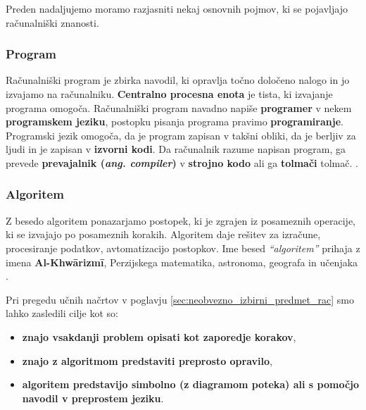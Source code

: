 
Preden nadaljujemo moramo razjasniti nekaj osnovnih pojmov, ki se
pojavljajo računalniški znanosti.

\subsubsection{Program}
\label{sec:program}

Računalniški program je zbirka navodil, ki opravlja točno določeno
nalogo in jo izvajamo na računalniku. \textbf{Centralno procesna
  enota} je tista, ki izvajanje programa omogoča. Računalniški program
navadno napiše \textbf{programer} v nekem \textbf{programskem jeziku},
postopku pisanja programa pravimo \textbf{programiranje}. Programski
jezik omogoča, da je program zapisan v takšni obliki, da je berljiv za
ljudi in je zapisan v \textbf{izvorni kodi}. Da računalnik razume
napisan program, ga prevede \textbf{prevajalnik
  (\emph{ang. compiler})} v \textbf{strojno kodo} ali ga
\textbf{tolmači} tolmač.  
\cite{wiki:computer_program}.

\subsubsection{Algoritem}
\label{sec:algoritem}

Z besedo algoritem ponazarjamo postopek, ki je zgrajen iz posameznih
operacije, ki se izvajajo po posameznih korakih. Algoritem daje rešitev
za izračune, procesiranje podatkov, avtomatizacijo postopkov.
Ime besed \emph{``algoritem''} prihaja z imena \textbf{Al-Khwārizmī},
Perzijskega matematika, astronoma, geografa in učenjaka \cite{wiki:algorithem}.

Pri pregedu učnih načrtov v poglavju
\ref{sec:neobvezno_izbirni_predmet_rac} smo lahko zasledili cilje kot
so:

\begin{itemize}
\tightlist
\item \textbf{znajo vsakdanji problem opisati kot zaporedje korakov},
\item \textbf{znajo z algoritmom predstaviti preprosto opravilo},
\item \textbf{algoritem predstavijo simbolno (z diagramom poteka) ali s
  pomočjo navodil v preprostem jeziku}.
\end{itemize}


